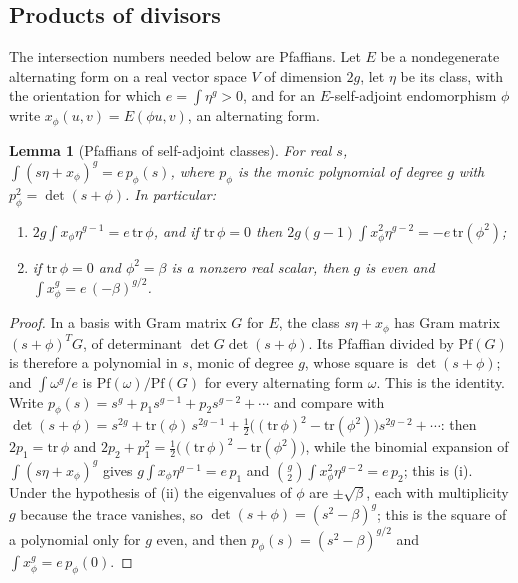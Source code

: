 \documentclass[11pt,reqno]{amsart}
\theoremstyle{plain}
\newtheorem{lemma}[theorem]{Lemma}
\theoremstyle{definition}
\theoremstyle{remark}
\begin{document}
\subsection{Products of divisors}

The intersection numbers needed below are Pfaffians. Let $E$ be a
nondegenerate alternating form on a real vector space $V$ of dimension $2g$,
let $\eta$ be its class, with the orientation for which
$e=\int\eta^{g}>0$, and for an $E$-self-adjoint endomorphism $\phi$ write
$x_{\phi}(u,v)=E(\phi u,v)$, an alternating form.

\begin{lemma}[Pfaffians of self-adjoint classes]\label{lem:pfaffian}
For real $s$, $\int(s\eta+x_{\phi})^{g}=e\,p_{\phi}(s)$, where $p_{\phi}$ is
the monic polynomial of degree $g$ with $p_{\phi}^{2}=\det(s+\phi)$. In
particular:
\begin{enumerate}[label=\textup{(\roman*)},nosep]
\item $2g\int x_{\phi}\eta^{g-1}=e\,\mathrm{tr}\,\phi$, and if
  $\mathrm{tr}\,\phi=0$ then
  $2g(g-1)\int x_{\phi}^{2}\eta^{g-2}=-e\,\mathrm{tr}(\phi^{2})$;
\item if $\mathrm{tr}\,\phi=0$ and $\phi^{2}=\beta$ is a nonzero real
  scalar, then $g$ is even and $\int x_{\phi}^{g}=e\,(-\beta)^{g/2}$.
\end{enumerate}
\end{lemma}

\begin{proof}
In a basis with Gram matrix $G$ for $E$, the class $s\eta+x_{\phi}$ has Gram
matrix $(s+\phi)^{T}G$, of determinant $\det G\det(s+\phi)$. Its Pfaffian
divided by $\mathrm{Pf}(G)$ is therefore a polynomial in $s$, monic of degree
$g$, whose square is $\det(s+\phi)$; and $\int\omega^{g}/e$ is
$\mathrm{Pf}(\omega)/\mathrm{Pf}(G)$ for every alternating form $\omega$.
This is the identity. Write $p_{\phi}(s)=s^{g}+p_{1}s^{g-1}+p_{2}s^{g-2}+\cdots$
and compare with
$\det(s+\phi)=s^{2g}+\mathrm{tr}(\phi)\,s^{2g-1}
+\tfrac12\bigl((\mathrm{tr}\,\phi)^{2}-\mathrm{tr}(\phi^{2})\bigr)s^{2g-2}+\cdots$:
then $2p_{1}=\mathrm{tr}\,\phi$ and
$2p_{2}+p_{1}^{2}=\tfrac12\bigl((\mathrm{tr}\,\phi)^{2}-\mathrm{tr}(\phi^{2})\bigr)$,
while the binomial expansion of $\int(s\eta+x_{\phi})^{g}$ gives
$g\int x_{\phi}\eta^{g-1}=e\,p_{1}$ and
$\binom{g}{2}\int x_{\phi}^{2}\eta^{g-2}=e\,p_{2}$; this is (i). Under the
hypothesis of (ii) the eigenvalues of $\phi$ are $\pm\sqrt{\beta}$, each with
multiplicity $g$ because the trace vanishes, so
$\det(s+\phi)=(s^{2}-\beta)^{g}$; this is the square of a polynomial only
for $g$ even, and then $p_{\phi}(s)=(s^{2}-\beta)^{g/2}$ and
$\int x_{\phi}^{g}=e\,p_{\phi}(0)$.
\end{proof}
\end{document}
